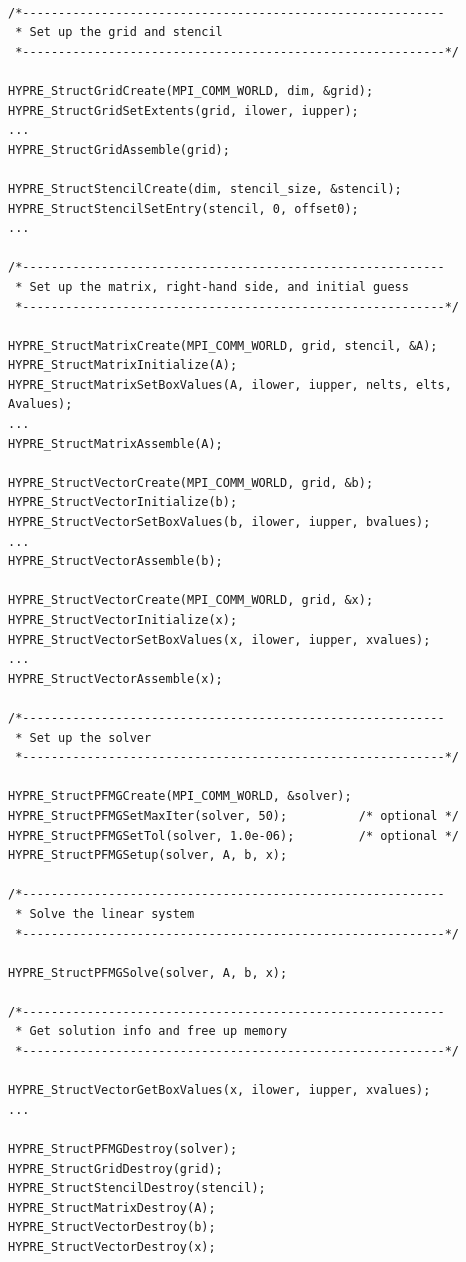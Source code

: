 \begin{display}
\begin{verbatim}

/*-----------------------------------------------------------
 * Set up the grid and stencil
 *-----------------------------------------------------------*/

HYPRE_StructGridCreate(MPI_COMM_WORLD, dim, &grid);
HYPRE_StructGridSetExtents(grid, ilower, iupper);
...
HYPRE_StructGridAssemble(grid);
	
HYPRE_StructStencilCreate(dim, stencil_size, &stencil);
HYPRE_StructStencilSetEntry(stencil, 0, offset0);
...

/*-----------------------------------------------------------
 * Set up the matrix, right-hand side, and initial guess
 *-----------------------------------------------------------*/

HYPRE_StructMatrixCreate(MPI_COMM_WORLD, grid, stencil, &A);
HYPRE_StructMatrixInitialize(A);
HYPRE_StructMatrixSetBoxValues(A, ilower, iupper, nelts, elts, Avalues);
...
HYPRE_StructMatrixAssemble(A);

HYPRE_StructVectorCreate(MPI_COMM_WORLD, grid, &b);
HYPRE_StructVectorInitialize(b);
HYPRE_StructVectorSetBoxValues(b, ilower, iupper, bvalues);
...
HYPRE_StructVectorAssemble(b);

HYPRE_StructVectorCreate(MPI_COMM_WORLD, grid, &x);
HYPRE_StructVectorInitialize(x);
HYPRE_StructVectorSetBoxValues(x, ilower, iupper, xvalues);
...
HYPRE_StructVectorAssemble(x);

/*-----------------------------------------------------------
 * Set up the solver
 *-----------------------------------------------------------*/

HYPRE_StructPFMGCreate(MPI_COMM_WORLD, &solver);
HYPRE_StructPFMGSetMaxIter(solver, 50);     	 /* optional */
HYPRE_StructPFMGSetTol(solver, 1.0e-06);    	 /* optional */
HYPRE_StructPFMGSetup(solver, A, b, x);

/*-----------------------------------------------------------
 * Solve the linear system
 *-----------------------------------------------------------*/

HYPRE_StructPFMGSolve(solver, A, b, x);

/*-----------------------------------------------------------
 * Get solution info and free up memory
 *-----------------------------------------------------------*/

HYPRE_StructVectorGetBoxValues(x, ilower, iupper, xvalues);
...

HYPRE_StructPFMGDestroy(solver);
HYPRE_StructGridDestroy(grid);
HYPRE_StructStencilDestroy(stencil);
HYPRE_StructMatrixDestroy(A);
HYPRE_StructVectorDestroy(b);
HYPRE_StructVectorDestroy(x);

\end{verbatim}
\end{display}

